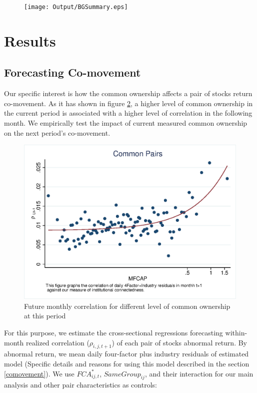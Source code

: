 \documentclass[12pt, a4paper]{article}
\begin{document}
\begin{figure}[htbp]
	\caption{}
	\label{BGSummary}
	\centering
	\texttt{[image: Output/BGSummary.eps]}
\end{figure}
\FloatBarrier




\section{Results}

\subsection{Forecasting Co-movement}
\label{Forecasting Co-movement}
Our specific interest is how the common ownership affects a pair of stocks return co-movement. As it has shown in figure \ref{mcorr50}, a higher level of common ownership in the current period is associated with a higher level of correlation in the following month. We empirically test the impact of current measured common ownership on the next period's co-movement.
 \begin{figure}[htbp]
 \centering  
        \centering
        \includegraphics[width=0.7\linewidth]{"Output/mcorr50.eps"} 
    \caption{Future monthly correlation for different level of common ownership at this period }
    \label{mcorr50}
\end{figure}

For this purpose, we estimate the cross-sectional regressions forecasting within-month realized correlation ($\rho_{i,j,t+1}$) of each pair of stocks abnormal return. By abnormal return, we mean daily four-factor plus industry residuals of estimated model (Specific details and reasons for using this model described in the section \ref{comovement}). We use $\textit{FCA}^*_{ij,t}$, $\textit{SameGroup}_{ij} $, and their interaction for our main analysis and other pair characteristics as controls:

\end{document}
